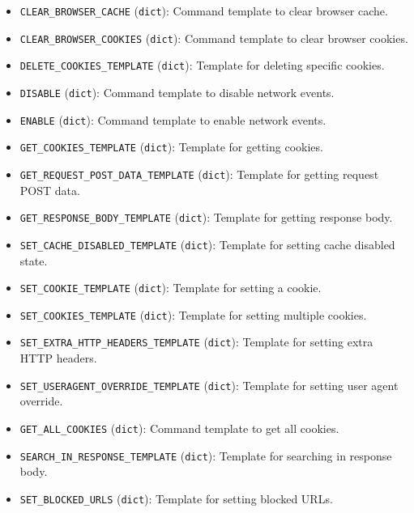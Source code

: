 \documentclass{article}
\begin{document}
\begin{itemize}
    \item \lstinline[style=pythonstyle]|CLEAR_BROWSER_CACHE| (\lstinline[style=pythonstyle]|dict|): Command template to clear browser cache.
    \item \lstinline[style=pythonstyle]|CLEAR_BROWSER_COOKIES| (\lstinline[style=pythonstyle]|dict|): Command template to clear browser cookies.
    \item \lstinline[style=pythonstyle]|DELETE_COOKIES_TEMPLATE| (\lstinline[style=pythonstyle]|dict|): Template for deleting specific cookies.
    \item \lstinline[style=pythonstyle]|DISABLE| (\lstinline[style=pythonstyle]|dict|): Command template to disable network events.
    \item \lstinline[style=pythonstyle]|ENABLE| (\lstinline[style=pythonstyle]|dict|): Command template to enable network events.
    \item \lstinline[style=pythonstyle]|GET_COOKIES_TEMPLATE| (\lstinline[style=pythonstyle]|dict|): Template for getting cookies.
    \item \lstinline[style=pythonstyle]|GET_REQUEST_POST_DATA_TEMPLATE| (\lstinline[style=pythonstyle]|dict|): Template for getting request POST data.
    \item \lstinline[style=pythonstyle]|GET_RESPONSE_BODY_TEMPLATE| (\lstinline[style=pythonstyle]|dict|): Template for getting response body.
    \item \lstinline[style=pythonstyle]|SET_CACHE_DISABLED_TEMPLATE| (\lstinline[style=pythonstyle]|dict|): Template for setting cache disabled state.
    \item \lstinline[style=pythonstyle]|SET_COOKIE_TEMPLATE| (\lstinline[style=pythonstyle]|dict|): Template for setting a cookie.
    \item \lstinline[style=pythonstyle]|SET_COOKIES_TEMPLATE| (\lstinline[style=pythonstyle]|dict|): Template for setting multiple cookies.
    \item \lstinline[style=pythonstyle]|SET_EXTRA_HTTP_HEADERS_TEMPLATE| (\lstinline[style=pythonstyle]|dict|): Template for setting extra HTTP headers.
    \item \lstinline[style=pythonstyle]|SET_USERAGENT_OVERRIDE_TEMPLATE| (\lstinline[style=pythonstyle]|dict|): Template for setting user agent override.
    \item \lstinline[style=pythonstyle]|GET_ALL_COOKIES| (\lstinline[style=pythonstyle]|dict|): Command template to get all cookies.
    \item \lstinline[style=pythonstyle]|SEARCH_IN_RESPONSE_TEMPLATE| (\lstinline[style=pythonstyle]|dict|): Template for searching in response body.
    \item \lstinline[style=pythonstyle]|SET_BLOCKED_URLS| (\lstinline[style=pythonstyle]|dict|): Template for setting blocked URLs.
\end{itemize}
\end{document}
